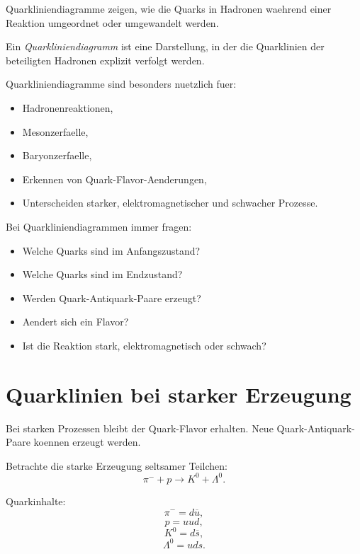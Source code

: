 Quarkliniendiagramme zeigen, wie die Quarks in Hadronen waehrend einer Reaktion
umgeordnet oder umgewandelt werden.

\begin{definitionbox}
Ein \emph{Quarkliniendiagramm} ist eine Darstellung, in der die Quarklinien der
beteiligten Hadronen explizit verfolgt werden.
\end{definitionbox}

\begin{conceptbox}
Quarkliniendiagramme sind besonders nuetzlich fuer:
\begin{itemize}
    \item Hadronenreaktionen,
    \item Mesonzerfaelle,
    \item Baryonzerfaelle,
    \item Erkennen von Quark-Flavor-Aenderungen,
    \item Unterscheiden starker, elektromagnetischer und schwacher Prozesse.
\end{itemize}
\end{conceptbox}

\begin{examtipbox}
Bei Quarkliniendiagrammen immer fragen:
\begin{itemize}
    \item Welche Quarks sind im Anfangszustand?
    \item Welche Quarks sind im Endzustand?
    \item Werden Quark-Antiquark-Paare erzeugt?
    \item Aendert sich ein Flavor?
    \item Ist die Reaktion stark, elektromagnetisch oder schwach?
\end{itemize}
\end{examtipbox}

\section{Quarklinien bei starker Erzeugung}

Bei starken Prozessen bleibt der Quark-Flavor erhalten.
Neue Quark-Antiquark-Paare koennen erzeugt werden.

\begin{examplebox}
Betrachte die starke Erzeugung seltsamer Teilchen:
\[
    \pi^- + p \rightarrow K^0 + \Lambda^0.
\]

Quarkinhalte:
\[
    \pi^- = d\overline{u},
\]
\[
    p=uud,
\]
\[
    K^0=d\overline{s},
\]
\[
    \Lambda^0=uds.
\]
\end{examplebox}

